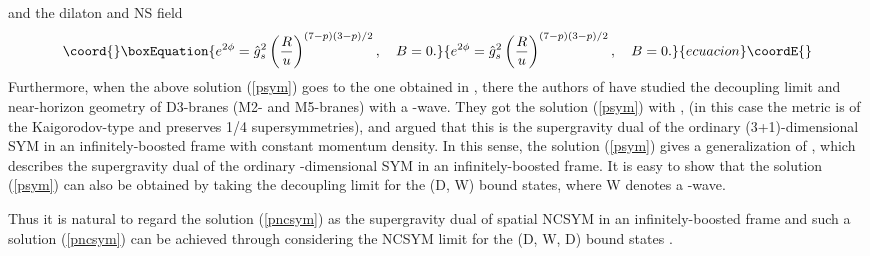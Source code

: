\documentclass[a4paper,12pt]{article}
\begin{document}
and the dilaton and NS \coordHE{} field
\begin{equation}\coord{}\boxEquation{
e^{2\phi}= \hat{g}_s^2 \left (\frac{R}{u}\right)^{(7-p)(3-p)/2},
 \ \ \ B=0.
}{
e^{2\phi}= \hat{g}_s^2 \left (\frac{R}{u}\right)^{(7-p)(3-p)/2},
 \ \ \ B=0.
}{ecuacion}\coordE{}\end{equation}
Furthermore, when \coordHE{} the above solution (\ref{psym}) goes to the one
obtained in \cite{Cveti}, there the authors of \cite{Cveti} have studied
the decoupling limit and near-horizon geometry of D3-branes (M2- and
M5-branes) with a \coordHE{}-wave. They got the solution (\ref{psym}) with \coordHE{},
(in this case the metric is of the Kaigorodov-type and preserves 1/4
supersymmetries), and argued that this is the supergravity dual of the
ordinary (3+1)-dimensional SYM in an infinitely-boosted frame with constant
momentum density. In this sense, the solution (\ref{psym}) gives a
generalization of \cite{Cveti}, which describes the supergravity dual of the
ordinary \coordHE{}-dimensional SYM in an infinitely-boosted frame. It is easy
to show that the solution (\ref{psym}) can also be obtained by taking the
decoupling limit for the (D\coordHE{}, W) bound states, where W denotes a \coordHE{}-wave.

Thus it is natural to regard the solution (\ref{pncsym}) as the supergravity
dual of spatial NCSYM in an infinitely-boosted frame and such a
solution (\ref{pncsym}) can be achieved through considering the NCSYM limit
for the (D\coordHE{}, W, D\coordHE{}) bound states \cite{Lu1,OZ}.
\end{document}
